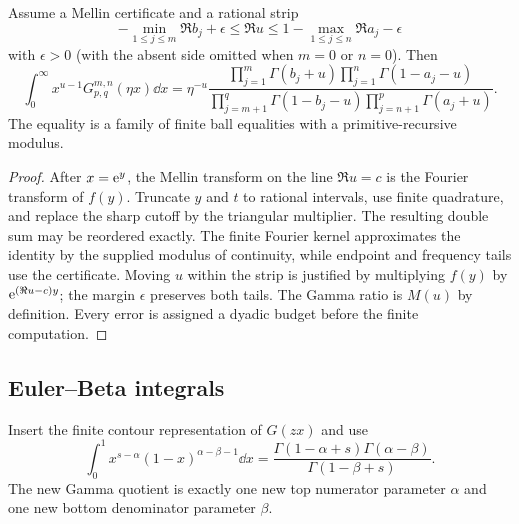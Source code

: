 \begin{theorem}\label{thm:mellin}
Assume a Mellin certificate and a rational strip
\begin{equation}\label{eq:mellin-strip}
 -\min_{1\le j\le m}\Re b_j+\epsilon
 \le\Re u\le
 1-\max_{1\le j\le n}\Re a_j-\epsilon
\end{equation}
with $\epsilon>0$ (with the absent side omitted when $m=0$ or $n=0$).  Then
\begin{equation}\label{eq:mellin-result}
 \int_0^\infty x^{u-1}G_{p,q}^{m,n}(\eta x)\dd x
 =\eta^{-u}
 \frac{\prod_{j=1}^{m}\Gamma(b_j+u)
       \prod_{j=1}^{n}\Gamma(1-a_j-u)}
      {\prod_{j=m+1}^{q}\Gamma(1-b_j-u)
       \prod_{j=n+1}^{p}\Gamma(a_j+u)}.
\end{equation}
The equality is a family of finite ball equalities with a primitive-recursive
modulus.
\end{theorem}
\begin{proof}
After $x=\mathrm e^y$, the Mellin transform on the line $\Re u=c$ is the Fourier
transform of $f(y)$.  Truncate $y$ and $t$ to rational intervals, use finite
quadrature, and replace the sharp cutoff by the triangular multiplier.  The
resulting double sum may be reordered exactly.  The finite Fourier kernel
approximates the identity by the supplied modulus of continuity, while endpoint
and frequency tails use the certificate.  Moving $u$ within the strip is
justified by multiplying $f(y)$ by $\mathrm e^{(\Re u-c)y}$; the margin $\epsilon$
preserves both tails.  The Gamma ratio is $M(u)$ by definition.  Every error is
assigned a dyadic budget before the finite computation.
\end{proof}

\subsection{Euler--Beta integrals}

Insert the finite contour representation of $G(zx)$ and use
\begin{equation}\label{eq:beta-inner}
 \int_0^1 x^{s-\alpha}(1-x)^{\alpha-\beta-1}\dd x
 =\frac{\Gamma(1-\alpha+s)\Gamma(\alpha-\beta)}
        {\Gamma(1-\beta+s)}.
\end{equation}
The new Gamma quotient is exactly one new top numerator parameter $\alpha$ and
one new bottom denominator parameter $\beta$.

